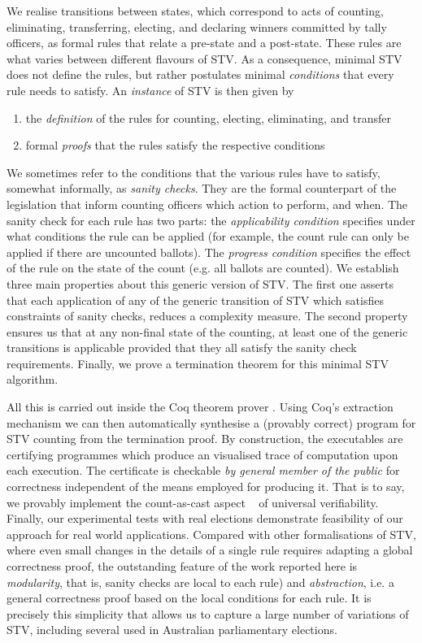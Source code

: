 \documentclass{llncs}
\begin{document}
We realise transitions between states, which correspond to acts of counting,
eliminating, transferring, electing, and declaring winners committed
by tally officers, as formal rules that relate a pre-state and a
post-state. These rules are what varies between different flavours
of STV. As a consequence, minimal STV does not define the rules, but
rather postulates minimal \emph{conditions} that every rule needs to
satisfy. An \emph{instance} of STV is then given by
\begin{enumerate}
\item the \emph{definition} of the rules for counting, electing,
eliminating, and transfer
\item formal \emph{proofs} that the rules satisfy the respective
conditions
\end{enumerate}

\noindent
We sometimes refer to the conditions that the various rules have to
satisfy, somewhat informally, as \emph{sanity checks}. They are the
formal counterpart of the  legislation that inform counting officers
which action to perform, and when. 
The sanity check for each rule has two parts: the
\emph{applicability condition} specifies under what conditions the
rule can be applied (for example, the count rule can only be applied
if there are uncounted ballots). The \emph{progress condition}
specifies the effect of the rule on the state of the count (e.g.
all ballots are counted). 
We establish
three  main properties about this generic version of STV. The first
one asserts that each application of any of the generic transition
of STV which satisfies constraints of sanity checks, reduces a
complexity measure. The second property ensures us that at any
non-final state of the counting, at least one of the generic
transitions is applicable provided that they all satisfy the sanity
check requirements. Finally, we prove a termination theorem for
this minimal STV algorithm. 

All this is carried out inside the Coq theorem prover
\cite{Bertot:2004:ITP}.  Using Coq's extraction mechanism
\cite{Letouzey:2003:NEC} we can then automatically synthesise a
(provably correct) program for STV counting from the termination
proof.  
By construction, the executables are certifying programmes which
produce an visualised trace of computation upon each execution. The
certificate is checkable \emph{by general member of the public} for
correctness independent of the means employed for producing it.
That is to say, we provably implement the count-as-cast
aspect ~\cite{DBLP:journals/iacr/CortierGKMT16} of universal
verifiability. Finally, our experimental tests with real
elections demonstrate feasibility of our approach for  real world
applications. Compared with other formalisations of STV, where
even small changes in the details of a single rule requires adapting
a global correctness proof, the outstanding feature of the work
reported here is \emph{modularity}, that is, sanity checks are local to each
rule) and \emph{abstraction}, i.e. a general correctness proof based
on the local conditions for each rule. It is precisely this
simplicity that allows us to capture a large number of variations of STV,
including several used in Australian parliamentary elections.
 
\end{document}

